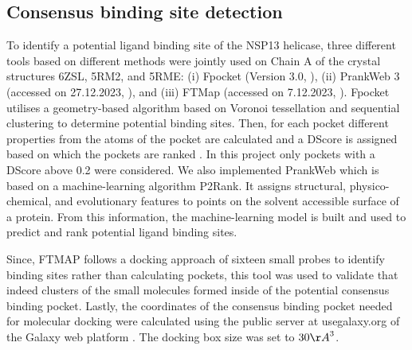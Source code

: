 \documentclass[11pt, letterpaper, titlepage]{article}
\renewcommand{\cite}{\parencite}
\begin{document}
\subsection{Consensus binding site detection}
To identify a potential ligand binding site of the NSP13 helicase, three different tools based on different methods were jointly used on Chain A of the crystal structures 6ZSL, 5RM2, and 5RME: (i) Fpocket (Version 3.0, \textcite{package_Fpocket}), (ii) PrankWeb 3 (accessed on 27.12.2023, \textcite{package_P2Rank, package_PrankWeb, package_PrankWeb3}), and (iii) FTMap (accessed on 7.12.2023, \textcite{package_FTMAP}).  
Fpocket \cite{package_Fpocket} utilises a geometry-based algorithm based on Voronoi tessellation and sequential clustering to determine potential binding sites. Then, for each pocket different properties from the atoms of the pocket are calculated and a \ac{DScore} is assigned based on which the pockets are ranked \cite{package_Fpocket}. In this project only pockets with a \ac{DScore} above 0.2 were considered. 
We also implemented PrankWeb \cite{package_P2Rank, package_PrankWeb, package_PrankWeb3} which is based on a machine-learning algorithm P2Rank. It assigns structural, physico-chemical, and evolutionary features to points on the solvent accessible surface of a protein. From this information, the machine-learning model is built and used to predict and rank potential ligand binding sites.

Since, FTMAP follows a docking approach of sixteen small probes to identify binding sites rather than calculating pockets, this tool was used to validate that indeed clusters of the small molecules formed inside of the potential consensus binding pocket. 
Lastly, the coordinates of the consensus binding pocket needed for molecular docking were calculated using the public server at usegalaxy.org of the Galaxy web platform \cite{galaxy}. The docking box size was set to $30 {\AA}^3$. 
\end{document}
